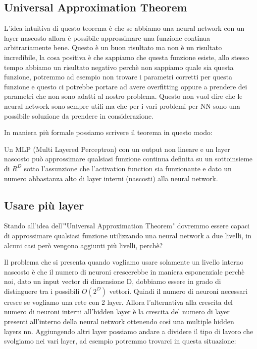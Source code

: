 \documentclass[14pt]{extreport}
\begin{document}
\subsection{Universal Approximation Theorem}

L'idea intuitiva di questo teorema è che se abbiamo una neural network con un layer nascosto allora è possibile approssimare una funzione continua
arbitrariamente bene. Questo è un buon risultato ma non è un risultato incredibile, la cosa positiva è che sappiamo che questa funzione esiste, allo
stesso tempo abbiamo un risultato negativo perchè non sappiamo quale sia questa funzione, potremmo ad esempio non trovare i parametri corretti per
questa funzione e questo ci potrebbe portare ad avere overfitting oppure a prendere dei parametri che non sono adatti al nostro problema. Questo non
vuol dire che le neural network sono sempre utili ma che per i vari problemi per NN sono una possibile soluzione da prendere in considerazione.

In maniera più formale possiamo scrivere il teorema in questo modo:

Un MLP (Multi Layered Perceptron) con un output non lineare e un layer nascosto può approssimare qualsiasi funzione continua definita su un
sottoinsieme di $R^D$ sotto l'assunzione che l'activation function sia funzionante e dato un numero abbastanza alto di layer interni (nascosti) alla
neural network.

\subsection{Usare più layer}

Stando all'idea dell'"Universal Approximation Theorem" dovremmo essere capaci di approssimare qualsiasi funzione utilizzando una neural network a due
livelli, in alcuni casi però vengono aggiunti più livelli, perchè?

Il problema che si presenta quando vogliamo usare solamente un livello interno nascosto è che il numero di neuroni crescerebbe in maniera esponenziale
perchè noi, dato un input vector di dimensione D, dobbiamo essere in grado di distinguere tra i possibili $O(2^D)$ vettori. Quindi il numero di
neuroni necessari cresce se vogliamo una rete con 2 layer. Allora l'alternativa alla crescita del numero di neuroni interni all'hidden layer è la
crescita del numero di layer presenti all'interno della neural network ottenendo così una multiple hidden layers nn. Aggiungendo altri layer possiamo
andare a dividere il tipo di lavoro che svolgiamo nei vari layer, ad esempio potremmo trovarci in questa situazione:
\end{document}
